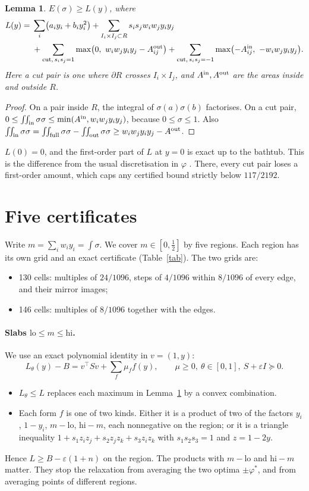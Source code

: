 \documentclass[11pt]{article}
\newtheorem{lemma}[theorem]{Lemma}
\newcommand{\vphi}{\varphi}
\begin{document}
\begin{lemma}\label{lem:disc}
$E(\sigma)\ge L(y)$, where
\begin{align*}
L(y)={}&\sum_i\bigl(a_iy_i+b_iy_i^2\bigr)+\sum_{I_i\times I_j\subset R}s_is_jw_iw_jy_iy_j\\
&+\sum_{\text{cut},\,s_is_j=1}\max\bigl(0,\ w_iw_jy_iy_j-A^{\rm out}_{ij}\bigr)
+\sum_{\text{cut},\,s_is_j=-1}\max\bigl(-A^{\rm in}_{ij},\ -w_iw_jy_iy_j\bigr).
\end{align*}
Here a cut pair is one where $\partial R$ crosses $I_i\times I_j$, and
$A^{\rm in},A^{\rm out}$ are the areas inside and outside $R$.
\end{lemma}
\begin{proof}
On a pair inside $R$, the integral of $\sigma(a)\sigma(b)$ factorises. On a cut pair,
$0\le\iint_{\rm in}\sigma\sigma\le\min(A^{\rm in},w_iw_jy_iy_j)$, because $0\le\sigma\le1$.
Also $\iint_{\rm in}\sigma\sigma=\iint_{\rm full}\sigma\sigma-\iint_{\rm out}\sigma\sigma\ge w_iw_jy_iy_j-A^{\rm out}$.
\end{proof}

$L(0)=0$, and the first-order part of $L$ at $y=0$ is exact up to the bathtub. This is the
difference from the usual discretisation in $\vphi$ \cite{PRS}. There, every cut pair loses a
first-order amount, which caps any certified bound strictly below $117/2192$.

\section{Five certificates}
Write $m=\sum_iw_iy_i=\int\sigma$. We cover $m\in[0,\frac12]$ by five regions. Each region has
its own grid and an exact certificate (Table~\ref{tab}). The two grids are:
\begin{itemize}
\item 130 cells: multiples of $24/1096$, steps of $4/1096$ within $8/1096$ of every edge, and
their mirror images;
\item 146 cells: multiples of $8/1096$ together with the edges.
\end{itemize}

\paragraph{Slabs $\mathrm{lo}\le m\le \mathrm{hi}$.}
We use an exact polynomial identity in $v=(1,y)$:
\[L_\theta(y)-B=v^\top Sv+\sum_f\mu_ff(y),\qquad \mu\ge0,\ \theta\in[0,1],\ S+\varepsilon I\succeq0 .\]
\begin{itemize}
\item $L_\theta\le L$ replaces each maximum in Lemma~\ref{lem:disc} by a convex combination.
\item Each form $f$ is one of two kinds. Either it is a product of two of the factors $y_i$,
$1-y_i$, $m-\mathrm{lo}$, $\mathrm{hi}-m$, each nonnegative on the region; or it is a
triangle inequality $1+s_1z_iz_j+s_2z_jz_k+s_3z_iz_k$ with $s_1s_2s_3=1$ and $z=1-2y$.
\end{itemize}
Hence $L\ge B-\varepsilon(1+n)$ on the region. The products with $m-\mathrm{lo}$ and $\mathrm{hi}-m$
matter. They stop the relaxation from averaging the two optima $\pm\vphi^*$, and from averaging
points of different regions.
\end{document}
